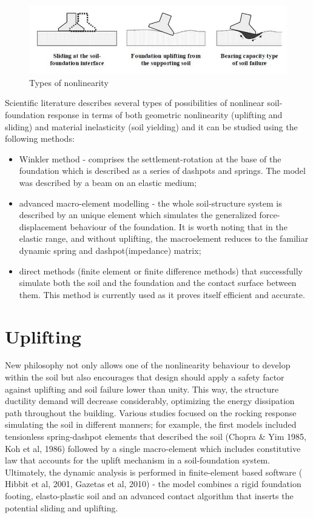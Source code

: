 \documentclass[10pt,a4paper]{report}
\begin{document}
\begin{figure}[h!]
	\centering
	\includegraphics[width=0.7\linewidth]{"nonlin"}
	\caption{Types of nonlinearity}
	\label{types}
\end{figure}
Scientific literature describes several types of possibilities of nonlinear soil-foundation response in terms of both geometric nonlinearity (uplifting and sliding) and material inelasticity (soil yielding) and it can be studied using the following methods:
\begin{itemize}
	\item 	Winkler method - comprises the settlement-rotation at the base of the foundation which is described as a series of dashpots and springs. The model was described by a beam on an elastic medium;
	\item 	advanced macro-element modelling - the whole soil-structure system is described by an unique element which simulates the generalized force-displacement behaviour of the foundation. It is worth noting that in the elastic range, and without uplifting, the macroelement reduces to the familiar dynamic spring and dashpot(impedance) matrix;
	
	\item direct methods (finite element or finite difference methods) that successfully simulate both the soil and the foundation and the contact surface between them. This method is currently used as it proves itself efficient and accurate.
\end{itemize}

\section{Uplifting}
New philosophy not only allows one of the nonlinearity behaviour to develop within the soil but also encourages that design should apply a safety factor against uplifting and soil failure lower than unity. This way, the structure ductility demand will decrease considerably, optimizing the energy dissipation path throughout the building. Various studies focused on the rocking response simulating the soil in different manners; for example, the first models included tensionless spring-dashpot elements that described the soil (Chopra \& Yim 1985, Koh et al, 1986) followed by a single macro-element which includes constitutive law that accounts for the uplift mechanism in a soil-foundation system. Ultimately, the dynamic analysis is performed in finite-element based software ( Hibbit et al, 2001, Gazetas et al, 2010) - the model combines a rigid foundation footing, elasto-plastic soil and an advanced contact algorithm that inserts the potential sliding and uplifting.
\end{document}

